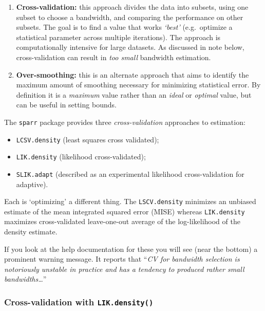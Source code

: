 \documentclass[
]{book}
\providecommand{\tightlist}{%
  \setlength{\itemsep}{0pt}\setlength{\parskip}{0pt}}
\newenvironment{rmdnote}[1]
  {
  \begin{itemize}
  \renewcommand{\labelitemi}{
    \raisebox{-.7\height}[0pt][0pt]{
      {\setkeys{Gin}{width=3em,keepaspectratio}\texttt{[image: images/\#1]}}
    }
  }
  \setlength{\fboxsep}{1em}
  \begin{note}
  \item
  }
  {
  \end{note}
  \end{itemize}
  }
\begin{document}
\begin{enumerate}
\def\labelenumi{\arabic{enumi}.}
\tightlist
\item
  \textbf{Cross-validation:} this approach divides the data into subsets, using one subset to choose a bandwidth, and comparing the performance on other subsets. The goal is to find a value that works \emph{`best'} (e.g.~optimize a statistical parameter across multiple iterations). The approach is computationally intensive for large datasets. As discussed in note below, cross-validation can result in \emph{too small} bandwidth estimation.
\item
  \textbf{Over-smoothing:} this is an alternate approach that aims to identify the maximum amount of smoothing necessary for minimizing statistical error. By definition it is a \emph{maximum} value rather than an \emph{ideal} or \emph{optimal} value, but can be useful in setting bounds.
\end{enumerate}

\begin{rmdnote}{note}
The \texttt{sparr} package provides three \emph{cross-validation} approaches to estimation:

\begin{itemize}
\tightlist
\item
  \texttt{LCSV.density} (least squares cross validated);
\item
  \texttt{LIK.density} (likelihood cross-validated);
\item
  \texttt{SLIK.adapt} (described as an experimental likelihood cross-validation for adaptive).
\end{itemize}

Each is `optimizing' a different thing. The \texttt{LSCV.density} minimizes an unbiased estimate of the mean integrated squared error (MISE) whereas \texttt{LIK.density} maximizes cross-validated leave-one-out average of the log-likelihood of the density estimate.

If you look at the help documentation for these you will see (near the bottom) a prominent warning message. It reports that ``\emph{CV for bandwidth selection is notoriously unstable in practice and has a tendency to produced rather small bandwidths\ldots{}}''

\end{rmdnote}

\hypertarget{cross-validation-with-lik.density}{%
\subsubsection{\texorpdfstring{Cross-validation with \texttt{LIK.density()}}{Cross-validation with LIK.density()}}\label{cross-validation-with-lik.density}}
\end{document}

